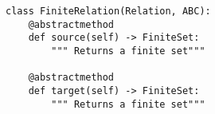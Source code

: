 \par\begin{minipage}{60ex}
\begin{verbatim}
class FiniteRelation(Relation, ABC):
    @abstractmethod
    def source(self) -> FiniteSet:
        """ Returns a finite set"""

    @abstractmethod
    def target(self) -> FiniteSet:
        """ Returns a finite set"""
\end{verbatim}
\end{minipage}\par